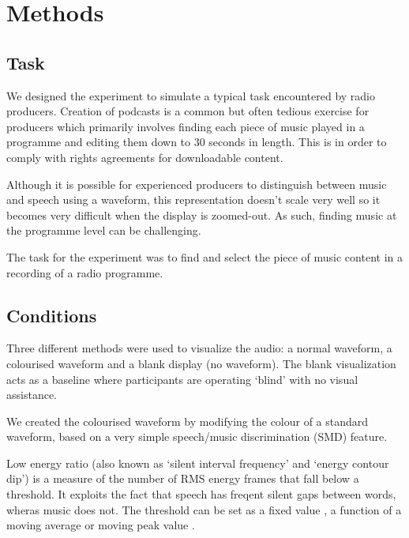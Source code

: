 \section{Methods}

\subsection{Task}\label{sec:studytask}
We designed the experiment to simulate a typical task encountered by radio producers. Creation of podcasts is a common
but often tedious exercise for producers which primarily involves finding each piece of music played in a programme and
editing them down to 30 seconds in length. This is in order to comply with rights agreements for downloadable content.

Although it is possible for experienced producers to distinguish between music and speech using a waveform, this
representation doesn't scale very well so it becomes very difficult when the display is zoomed-out. As such, finding
music at the programme level can be challenging.

The task for the experiment was to find and select the piece of music content in a recording of a radio programme.

\subsection{Conditions}\label{sec:colourised-conditions}
Three different methods were used to visualize the audio: a normal waveform, a colourised waveform and a blank
display (no waveform). The blank visualization acts as a baseline where participants are operating `blind' with no
visual assistance.



We created the colourised waveform by modifying the colour of a standard waveform, based on a very simple speech/music
discrimination (SMD) feature.



Low energy ratio (also known as `silent interval frequency' and `energy contour
dip') is a measure of the number of RMS energy frames that fall below a
threshold. It exploits the fact that speech has freqent silent gaps between
words, wheras music does not. The threshold can be set as a fixed value
\citep{Liang2005}, a function of a moving average \citep{Ericsson2009} or moving
peak value \citep{Saunders1996}.


